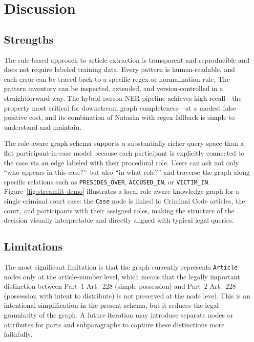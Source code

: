 \documentclass[11pt]{article}
\begin{document}
\section{Discussion}

\subsection{Strengths}

The rule-based approach to article extraction is transparent and reproducible and does not require labeled training data. Every pattern is human-readable, and each error can be traced back to a specific regex or normalization rule. The pattern inventory can be inspected, extended, and version-controlled in a straightforward way. The hybrid person NER pipeline achieves high recall---the property most critical for downstream graph completeness---at a modest false positive cost, and its combination of Natasha with regex fallback is simple to understand and maintain.

The role-aware graph schema supports a substantially richer query space than a flat participant-in-case model because each participant is explicitly connected to the case via an edge labeled with their procedural role. Users can ask not only ``who appears in this case?'' but also ``in what role?'' and traverse the graph along specific relations such as \texttt{PRESIDES\_OVER}, \texttt{ACCUSED\_IN}, or \texttt{VICTIM\_IN}. Figure~\ref{fig:streamlit-demo} illustrates a local role-aware knowledge graph for a single criminal court case: the \texttt{Case} node is linked to Criminal Code articles, the court, and participants with their assigned roles, making the structure of the decision visually interpretable and directly aligned with typical legal queries.

\subsection{Limitations}

The most significant limitation is that the graph currently represents \texttt{Article} nodes only at the article-number level, which means that the legally important distinction between Part~1 Art.~228 (simple possession) and Part~2 Art.~228 (possession with intent to distribute) is not preserved at the node level. This is an intentional simplification in the present schema, but it reduces the legal granularity of the graph. A future iteration may introduce separate nodes or attributes for parts and subparagraphs to capture these distinctions more faithfully.
\end{document}
